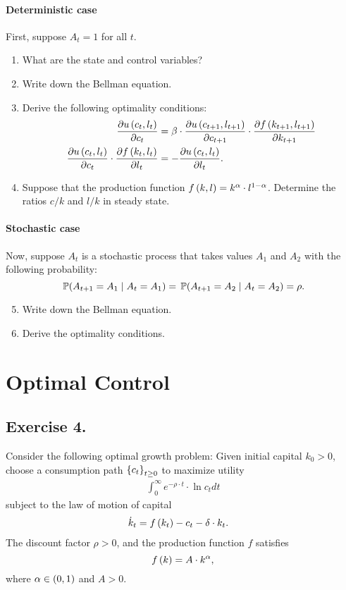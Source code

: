 \documentclass[letterpaper,12pt,leqno]{article}
\begin{document}
\paragraph{Deterministic case} First, suppose $A_{t}=1$ for all $t$.

\begin{enumerate}
\item What are the state and control variables?
\item  Write down the Bellman equation.
\item Derive the following optimality conditions: 
\begin{align*}
\frac{\partial u\left( c_{t},l_{t} \right)}{\partial  c_{t}} &=\beta \cdot \frac{\partial u\left( c_{t+1},l_{t+1} \right)}{\partial c_{t+1}} \cdot \frac{\partial f\left( k_{t+1},l_{t+1} \right)}{\partial  k_{t+1}}\\
\frac{\partial u\left( c_{t},l_{t} \right)}{\partial  c_{t}}\cdot \frac{\partial f\left( k_{t},l_{t} \right)}{\partial l_{t}} &=-\frac{\partial u\left( c_{t},l_{t} \right)}{\partial l_{t}}.
\end{align*}
\item Suppose that the production function $f\left( k,l \right) =k^{\alpha}\cdot l^{1-\alpha}$. Determine the ratios $c/k$ and $l/k$ in steady state.
\end{enumerate}

\paragraph{Stochastic case} Now, suppose $A_{t}$ is a stochastic process that takes values $A_{1}$ and $A_{2}$ with the following probability: 
\begin{equation*}
\P{A_{t+1}=A_{1}\mid A_{t}=A_{1}} =\P{A_{t+1}=A_{2}\mid A_{t}=A_{2}} =\rho .
\end{equation*}

\begin{enumerate}\setcounter{enumi}{4}
\item Write down the Bellman equation.
\item Derive the optimality conditions.
\end{enumerate}

\section*{Optimal Control}

\subsection*{Exercise 4.}

Consider the following optimal growth problem: Given initial capital $k_{0}>0$, choose a consumption path $\left\lbrace c_{t} \right\rbrace_{t\geq 0}$ to maximize utility
\begin{align*}
\int_{0}^{\infty}e^{-\rho\cdot  t} \cdot \ln{c_{t}} dt 
\end{align*}
subject to the law of motion of capital
\begin{align*}
\dot{k}_{t} &=f\left( k_{t} \right) -c_{t}-\delta \cdot k_{t}.
\end{align*}
The discount factor $\rho>0$, and the production function $f$ satisfies
 \[f\left( k \right) =A\cdot k^{\alpha},\]
 where  $\alpha \in \left( 0,1 \right)$ and $A>0$.
\end{document}
